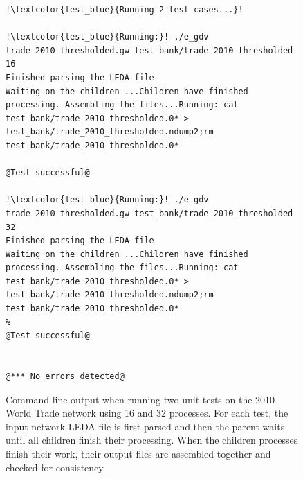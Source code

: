 

\begin{figure}[H]
\begin{lstlisting}[style=base,escapechar=!]
!\textcolor{test_blue}{Running 2 test cases...}!

!\textcolor{test_blue}{Running:}! ./e_gdv trade_2010_thresholded.gw test_bank/trade_2010_thresholded 16
Finished parsing the LEDA file
Waiting on the children ...Children have finished processing. Assembling the files...Running: cat test_bank/trade_2010_thresholded.0* > test_bank/trade_2010_thresholded.ndump2;rm test_bank/trade_2010_thresholded.0*

@Test successful@

!\textcolor{test_blue}{Running:}! ./e_gdv trade_2010_thresholded.gw test_bank/trade_2010_thresholded 32
Finished parsing the LEDA file
Waiting on the children ...Children have finished processing. Assembling the files...Running: cat test_bank/trade_2010_thresholded.0* > test_bank/trade_2010_thresholded.ndump2;rm test_bank/trade_2010_thresholded.0*
% 
@Test successful@


@*** No errors detected@

\end{lstlisting}
\caption[Command-line output when running two unit tests on the 2010 World Trade network]{Command-line output when running two unit tests on the 2010 World Trade network using 16 and 32 processes. For each test, the input network LEDA file is first parsed and then the parent waits until all children finish their processing. When the children processes finish their work, their output files are assembled together and checked for consistency.}
\label{fig:unit_test_output}
\end{figure}
